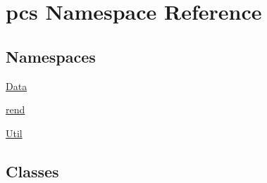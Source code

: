 \hypertarget{namespacepcs}{}\section{pcs Namespace Reference}
\label{namespacepcs}
\subsection*{Namespaces}
\begin{DoxyCompactItemize}
\item 
 \hyperlink{namespacepcs_1_1Data}{Data}
\item 
 \hyperlink{namespacepcs_1_1rend}{rend}
\item 
 \hyperlink{namespacepcs_1_1Util}{Util}
\end{DoxyCompactItemize}
\subsection*{Classes}

